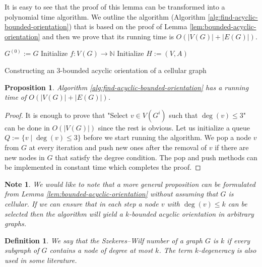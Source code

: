 \documentclass[a4paper, 12pt]{article}
\newtheorem{state}[lem]{Proposition}
\newtheorem{defin}[lem]{Definition}
\newtheorem{note}[lem]{Note}
\begin{document}
It is easy to see that the proof of this lemma can be transformed into a polynomial time algorithm. We outline the algorithm (Algorithm \ref{alg:find-acyclic-bounded-orientation}) that is based on the proof of Lemma \ref{lem:bounded-acyclic-orientation} and then we prove that its running time is $O(|V(G)| + |E(G)|)$.
\begin{algorithm}\label{alg:find-acyclic-bounded-orientation}
 $G^{(0)} := G$\;
 Initialize $f \colon V(G) \to \mathbb{N}$\;
 Initialize $H:=(V,A)$\;
 \caption{Constructing an $3$-bounded acyclic orientation of a cellular graph}
\end{algorithm}
\begin{state}\label{state:acyclic-complexity-proof} Algorithm \ref{alg:find-acyclic-bounded-orientation} has a running time of $O(|V(G)| + |E(G)|)$.
\end{state}
\begin{proof}
It is enough to prove that "Select $v \in V(G^i)$ such that $\deg(v) \leqslant 3$" can be done in $O(|V(G)|)$ since the rest is obvious. Let us initialize a queue $Q := \lbrace v \mid \deg(v) \leqslant  3\rbrace$ before we start running the algorithm. We pop a node $v$ from $G$ at every iteration and push new ones after the removal of $v$ if there are new nodes in $G$ that satisfy the degree condition. The pop and push methods can be implemented in constant time which completes the proof.
\end{proof}

\begin{note} We would like to note that a more general proposition can be formulated from Lemma \ref{lem:bounded-acyclic-orientation} without assuming that $G$ is cellular. If we can ensure that in each step a node $v$ with $\deg(v) \leqslant k$ can be selected then the algorithm will yield a $k$-bounded acyclic orientation in arbitrary graphs.
\end{note}

\begin{defin} We say that the Szekeres\---Wilf number of a graph $G$ is $k$ if every subgraph of $G$ contains a node of degree at most $k$. The term $k$-degeneracy is also used in some literature.
\end{defin}
\end{document}

